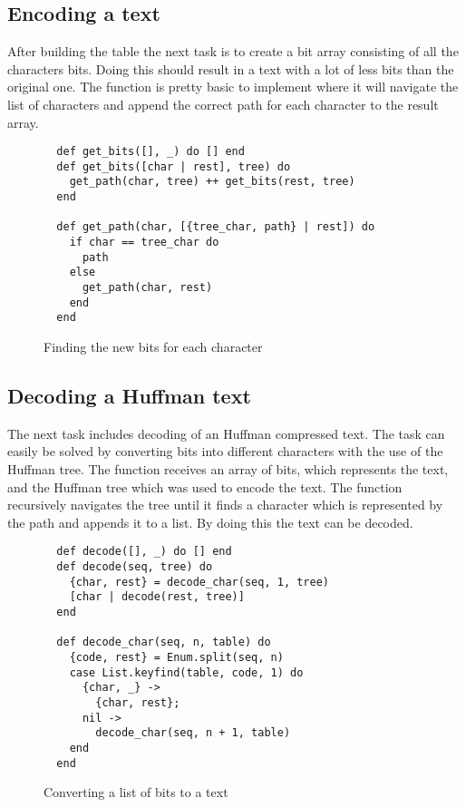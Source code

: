 \documentclass[a4paper,11pt]{article}
\begin{document}
\subsection*{Encoding a text}
After building the table the next task is to create a bit array consisting of all the characters bits. Doing this should result in a text with a lot of less bits than the original one. The function is pretty basic to implement where it will navigate the list of characters and append the correct path for each character to the result array.

\begin{figure}[H]
\begin{verbatim}
  def get_bits([], _) do [] end
  def get_bits([char | rest], tree) do
    get_path(char, tree) ++ get_bits(rest, tree)
  end

  def get_path(char, [{tree_char, path} | rest]) do
    if char == tree_char do
      path
    else
      get_path(char, rest)
    end
  end
\end{verbatim}
\caption{Finding the new bits for each character}
\label{Figure:4}
\end{figure}

\subsection*{Decoding a Huffman text}
The next task includes decoding of an Huffman compressed text. The task can easily be solved by converting bits into different characters with the use of the Huffman tree. The function receives an array of bits, which represents the text, and the Huffman tree which was used to encode the text. The function recursively navigates the tree until it finds a character which is represented by the path and appends it to a list. By doing this the text can be decoded.

\begin{figure}[H]
\begin{verbatim}
  def decode([], _) do [] end
  def decode(seq, tree) do
    {char, rest} = decode_char(seq, 1, tree)
    [char | decode(rest, tree)]
  end

  def decode_char(seq, n, table) do
    {code, rest} = Enum.split(seq, n)
    case List.keyfind(table, code, 1) do
      {char, _} ->
        {char, rest};
      nil ->
        decode_char(seq, n + 1, table)
    end
  end
\end{verbatim}
\caption{Converting a list of bits to a text}
\label{Figure:5}
\end{figure}
\end{document}

